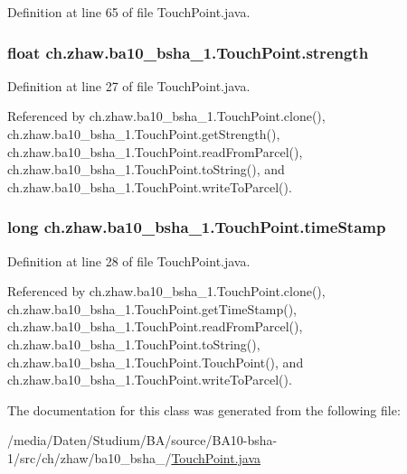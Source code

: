 Definition at line 65 of file TouchPoint.java.\hypertarget{classch_1_1zhaw_1_1ba10__bsha__1_1_1TouchPoint_ad245f48693fecee2b25f3c5e7e1976a8}{
\subsubsection[{strength}]{\setlength{\rightskip}{0pt plus 5cm}float {\bf ch.zhaw.ba10\_\-bsha\_\-1.TouchPoint.strength}}}
\label{classch_1_1zhaw_1_1ba10__bsha__1_1_1TouchPoint_ad245f48693fecee2b25f3c5e7e1976a8}


Definition at line 27 of file TouchPoint.java.

Referenced by ch.zhaw.ba10\_\-bsha\_\-1.TouchPoint.clone(), ch.zhaw.ba10\_\-bsha\_\-1.TouchPoint.getStrength(), ch.zhaw.ba10\_\-bsha\_\-1.TouchPoint.readFromParcel(), ch.zhaw.ba10\_\-bsha\_\-1.TouchPoint.toString(), and ch.zhaw.ba10\_\-bsha\_\-1.TouchPoint.writeToParcel().\hypertarget{classch_1_1zhaw_1_1ba10__bsha__1_1_1TouchPoint_aa0b6bef79c301e7ef664dd21045b517d}{
\subsubsection[{timeStamp}]{\setlength{\rightskip}{0pt plus 5cm}long {\bf ch.zhaw.ba10\_\-bsha\_\-1.TouchPoint.timeStamp}}}
\label{classch_1_1zhaw_1_1ba10__bsha__1_1_1TouchPoint_aa0b6bef79c301e7ef664dd21045b517d}


Definition at line 28 of file TouchPoint.java.

Referenced by ch.zhaw.ba10\_\-bsha\_\-1.TouchPoint.clone(), ch.zhaw.ba10\_\-bsha\_\-1.TouchPoint.getTimeStamp(), ch.zhaw.ba10\_\-bsha\_\-1.TouchPoint.readFromParcel(), ch.zhaw.ba10\_\-bsha\_\-1.TouchPoint.toString(), ch.zhaw.ba10\_\-bsha\_\-1.TouchPoint.TouchPoint(), and ch.zhaw.ba10\_\-bsha\_\-1.TouchPoint.writeToParcel().

The documentation for this class was generated from the following file:\begin{DoxyCompactItemize}
\item 
/media/Daten/Studium/BA/source/BA10-\/bsha-\/1/src/ch/zhaw/ba10\_\-bsha\_/\hyperlink{TouchPoint_8java}{TouchPoint.java}\end{DoxyCompactItemize}
